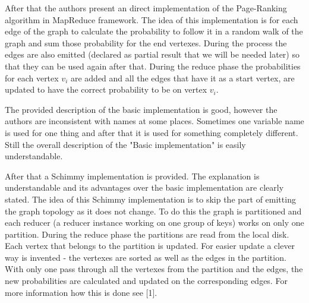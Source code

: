 \documentclass[12pt]{article}
\theoremstyle{plain}
\begin{document}

  After that the authors present an direct implementation of the
  Page-Ranking algorithm in MapReduce framework. The idea of this implementation
  is for each edge of the graph to calculate the probability to follow it in
  a random walk of the graph and sum those probability for the end vertexes. 
  During the process the edges are also emitted (declared as partial result that
  we will be needed later) so that they can be used again after that. During the
  reduce phase the probabilities for each vertex $v_i$ are added and all the
  edges that have it as a start vertex, are updated to have the correct
  probability to be on vertex $v_i$.
  
  The provided description of the basic implementation is good, however the
  authors are inconsistent with names at some places. Sometimes one variable
  name is used for one thing and after that it is used for something completely
  different. Still the overall description of the "Basic implementation" is
  easily understandable.  

  After that a Schimmy implementation is provided. The explanation is
  understandable and its advantages over the basic implementation are clearly
  stated. The idea of this Schimmy implementation is to skip the part of
  emitting the graph topology as it does not change. To do this the graph is
  partitioned and each reducer (a reducer instance working on one group of
  keys) works on only one partition. During the reduce phase the partitions are
  read from the local disk. Each vertex that belongs to the partition is
  updated.  For easier update a clever way is invented - the vertexes are
  sorted as well as the edges in the partition. With only one pass through all
  the vertexes from the partition and the edges, the new probabilities are
  calculated and updated on the corresponding edges. For more information how
  this is done see [1]. 
\end{document}

